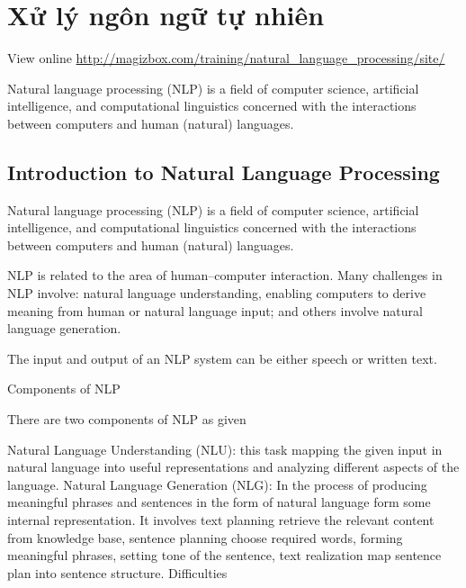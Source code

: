\chapter{Xử lý ngôn ngữ tự nhiên}

View online \href{http://magizbox.com/training/natural_language_processing/site/}{http://magizbox.com/training/natural_language_processing/site/}



Natural language processing (NLP) is a field of computer science, artificial intelligence, and computational linguistics concerned with the interactions between computers and human (natural) languages.

\section{Introduction to Natural Language Processing}

Natural language processing (NLP) is a field of computer science, artificial intelligence, and computational linguistics concerned with the interactions between computers and human (natural) languages.

NLP is related to the area of human–computer interaction. Many challenges in NLP involve: natural language understanding, enabling computers to derive meaning from human or natural language input; and others involve natural language generation.

The input and output of an NLP system can be either speech or written text.

Components of NLP

There are two components of NLP as given

Natural Language Understanding (NLU): this task mapping the given input in natural language into useful representations and analyzing different aspects of the language.
Natural Language Generation (NLG): In the process of producing meaningful phrases and sentences in the form of natural language form some internal representation. It involves text planning retrieve the relevant content from knowledge base, sentence planning choose required words, forming meaningful phrases, setting tone of the sentence, text realization map sentence plan into sentence structure.
Difficulties

